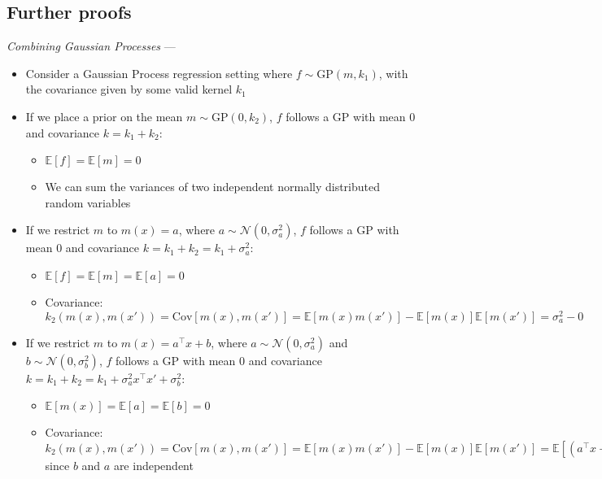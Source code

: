 \subsection*{Further proofs}
\emph{Combining Gaussian Processes} --- 
\begin{itemize}
    \item Consider a Gaussian Process regression setting where $f \sim \text{GP}(m, k_1)$, with the covariance given by some valid kernel $k_1$ 
    \item If we place a prior on the mean $m \sim \text{GP}(0, k_2)$, $f$ follows a GP with mean $0$ and covariance $k = k_1 + k_2$: 
    \begin{itemize}
        \item $\mathbb{E}[f] = \mathbb{E}[m] = 0$
        \item We can sum the variances of two independent normally distributed random variables
    \end{itemize}
    \item If we restrict $m$ to $m(x) = a$, where $a \sim \mathcal{N}(0, \sigma_a^2)$, $f$ follows a GP with mean $0$ and covariance $k = k_1 + k_2 = k_1 + \sigma_a^2$: 
    \begin{itemize}
        \item $\mathbb{E}[f] = \mathbb{E}[m] = \mathbb{E}[a] = 0$
        \item Covariance:
        $
        k_2(m(x), m(x')) = \text{Cov}[m(x), m(x')] = \mathbb{E}[m(x)m(x')] - \mathbb{E}[m(x)]\mathbb{E}[m(x')] = \sigma_a^2 - 0
        $
    \end{itemize}
    \item If we restrict $m$ to $m(x) = a^\intercal x + b$, where $a \sim \mathcal{N}(0, \sigma_a^2)$ and $b \sim \mathcal{N}(0, \sigma_b^2)$, $f$ follows a GP with mean $0$ and covariance $k = k_1 + k_2 = k_1 + \sigma_a^2 x^\intercal x' + \sigma_b^2$: 
    \begin{itemize}
        \item $\mathbb{E}[m(x)] = \mathbb{E}[a] = \mathbb{E}[b] = 0$
        \item Covariance:
        $
        k_2(m(x), m(x')) = \text{Cov}[m(x), m(x')] = \mathbb{E}[m(x)m(x')] - \mathbb{E}[m(x)]\mathbb{E}[m(x')] = \mathbb{E}[(a^\intercal x + b)(a^\intercal x' + b)] - 0 = \mathbb{E}[(a^\intercal x)(a^\intercal x')] + \mathbb{E}[b^2] + \mathbb{E}[ba^\intercal(x + x')] = \sigma_a^2 x^\intercal x' + \sigma_b^2 + 0
        $ since $b$ and $a$ are independent
    \end{itemize}
\end{itemize}


